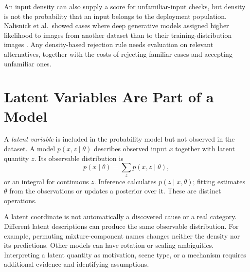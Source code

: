 An input density can also supply a score for unfamiliar-input checks, but density is not the probability that an input belongs to the deployment population. Nalisnick et al.\ showed cases where deep generative models assigned higher likelihood to images from another dataset than to their training-distribution images \citep{nalisnick2019ood}. Any density-based rejection rule needs evaluation on relevant alternatives, together with the costs of rejecting familiar cases and accepting unfamiliar ones.

\section{Latent Variables Are Part of a Model}

A \emph{latent variable} is included in the probability model but not observed in the dataset. A model $p(x,z\mid\theta)$ describes observed input $x$ together with latent quantity $z$. Its observable distribution is
\[
p(x\mid\theta)=\sum_z p(x,z\mid\theta),
\]
or an integral for continuous $z$. Inference calculates $p(z\mid x,\theta)$; fitting estimates $\theta$ from the observations or updates a posterior over it. These are distinct operations.

\par\addvspace{\intextsep}\noindent\begin{minipage}{\linewidth}
\centering
{}
\label{fig:latent-generation-inference}
\end{minipage}\par\addvspace{\intextsep}

A latent coordinate is not automatically a discovered cause or a real category. Different latent descriptions can produce the same observable distribution. For example, permuting mixture-component names changes neither the density nor its predictions. Other models can have rotation or scaling ambiguities. Interpreting a latent quantity as motivation, scene type, or a mechanism requires additional evidence and identifying assumptions.

